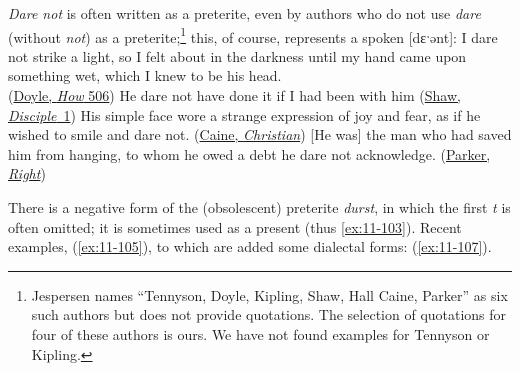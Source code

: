 \textit{Dare not} is often written as a preterite, even by authors who do not use \textit{dare} (without \textit{not}) as a preterite;\footnote{Jespersen names ``Tennyson, Doyle, Kipling, Shaw, Hall Caine, Parker'' as six such authors but does not provide quotations. The selection of quotations for four of these authors is ours. We have not found examples for Tennyson or Kipling. \eds} this, of course, represents a spoken [dɛˑənt]:
\ea
\ea
I dare not strike a light, so I felt about in the darkness until my hand came upon something wet, which I knew to be his head. \\\hfill (\href{https://archive.org/details/TheStrandMagazineAnIllustratedMonthly/TheStrandMagazine1895aVol.IxJan-jun/page/n519/mode/2up?q=%22dare+not+strike%22&view=theater}{Doyle, \textit{How} 506})
\ex
He dare not have done it if I had been with him \hfill (\href{https://archive.org/details/devilsdisciplea00shawgoog/page/n16/mode/2up?q=%22dare+not%22&view=theater}{Shaw, \textit{Disciple}~1})
\ex
His simple face wore a strange expression of joy and fear, as if he wished to smile and dare not. \hfill (\href{https://archive.org/details/christianstory00cainrich/page/390/mode/2up?q=%22dare+not%22&view=theater}{Caine, \textit{Christian}})
\ex
{}[He was] the man who had saved him from hanging, to whom he owed a debt he dare not acknowledge. \hfill (\href{https://archive.org/details/bwb_UE-390-059/page/84/mode/2up?view=theater&q=%22dare+not+acknowledge%22}{Parker, \textit{Right}})
\z
\z

There is a negative form of the (obsolescent) preterite \textit{durst}, in which the first \textit{t} is often omitted; it is sometimes used as a present (thus  \ref{ex:11-103}). Recent examples, (\ref{ex:11-105}), to which are added some dialectal forms: (\ref{ex:11-107}).

